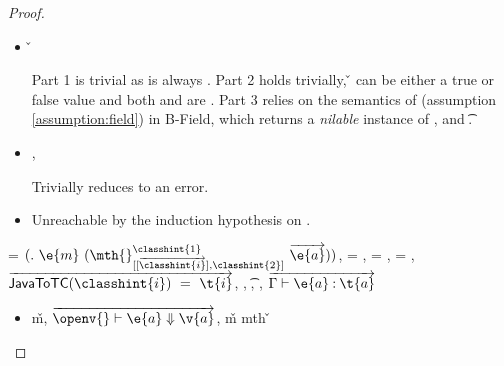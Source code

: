 \begin{lemma}
\begin{proof}
\begin{case}[T-FieldStatic]
\begin{itemize}
  \item[]
\begin{subcase}[B-Field]
  \opsem {\openv{}}
         {} 
         { {\classfieldpair{\fld{}} {\v{}}}}


Part 1 is trivial as \object{} is always \emptyobject{}.
Part 2 holds trivially, \v{} can be either a true or false value
and both {\thenprop{\prop{}}} and {\elseprop{\prop{}}}
are \topprop{}.
Part 3 relies on the semantics of \getfieldliteral (assumption \ref{assumption:field})
in B-Field, which returns a \emph{nilable} instance of ,
and  {\t{}}.
\end{subcase}
  \item[]
\begin{subcase}[BE-Field]
  \opsem {\openv{}}
         {} 
         {\errorvalv{}},
  \opsem {\openv{}}
         {\e{}}
         {\errorvalv{}}

         Trivially reduces to an error.

\end{subcase}

\item[]
\begin{subcase}[BW-Field]
  Unreachable by the induction hypothesis on .
\end{subcase}
\end{itemize}
\end{case}

\begin{case}[T-MethodStatic]
  \e{} = ${\methodstaticexp {\classhint{1}} 
                          {\overrightarrow {\classhint{i}}} 
                          {\classhint{2}}
                          {\mth{}} {\e{m}} {\overrightarrow{\e{a}}}}$,
  \thenprop{\prop{}} = \topprop{}, \elseprop{\prop{}} = \topprop{}, \object{} = \emptyobject{},
  $\overrightarrow{\javatotc {\classhint{i}} {\t{i}}}$,
              {\class{}},
              {\t{}},
  \judgementtwo {\propenv{}} { {\class{}}},
             $\overrightarrow{
  \judgementtwo {\propenv{}} {\hastype {\e{a}} {\t{a}}}
                  }$

\begin{itemize}
  \item[]
\begin{subcase}[B-Method]
  \opsem {\openv{}}
         {}
         {\v{m}},
  $\overrightarrow{
  \opsem {\openv{}}
         {\e{a}}
         {\v{a}}}$,
   {\v{m}} {mth}
                    {} {}
                    {}
                    {\v{}}



\end{subcase}
\end{itemize}
\end{case}
\end{proof}
\end{lemma}
